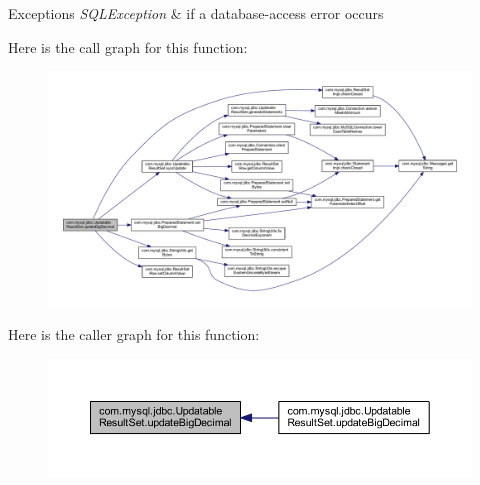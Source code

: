 \begin{DoxyExceptions}{Exceptions}
{\em S\+Q\+L\+Exception} & if a database-\/access error occurs \\
\hline
\end{DoxyExceptions}
Here is the call graph for this function\+:
\nopagebreak
\begin{figure}[H]
\begin{center}
\leavevmode
\includegraphics[width=350pt]{classcom_1_1mysql_1_1jdbc_1_1_updatable_result_set_ae8d8055f2d9a3075964d68982050df9e_cgraph}
\end{center}
\end{figure}
Here is the caller graph for this function\+:
\nopagebreak
\begin{figure}[H]
\begin{center}
\leavevmode
\includegraphics[width=350pt]{classcom_1_1mysql_1_1jdbc_1_1_updatable_result_set_ae8d8055f2d9a3075964d68982050df9e_icgraph}
\end{center}
\end{figure}
\mbox{\label{classcom_1_1mysql_1_1jdbc_1_1_updatable_result_set_acd7546dfd3c2aac7992447a458b3f9c8}} 
